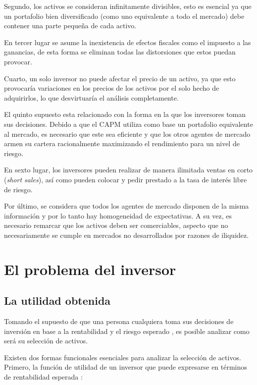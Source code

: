 Segundo, los activos se consideran infinitamente divisibles, esto es esencial ya que un portafolio bien diversificado (como uno equivalente a todo el mercado) debe contener una parte pequeña de cada activo. 

En tercer lugar se asume la inexistencia de efectos fiscales como el impuesto a las ganancias, de esta forma se eliminan todas las distorsiones que estos puedan provocar. 

Cuarto, un solo inversor no puede afectar el precio de un activo, ya que esto provocaría variaciones en los precios de los activos por el solo hecho de adquirirlos, lo que desvirtuaría el análisis completamente. 

El quinto supuesto esta relacionado con la forma en la que los inversores toman sus decisiones. Debido a que el CAPM utiliza como base un portafolio equivalente al mercado, es necesario que este sea eficiente y que los otros agentes de mercado armen su cartera racionalmente maximizando el rendimiento para un nivel de riesgo.

En sexto lugar, los inversores pueden realizar de manera ilimitada ventas en corto (\textit{short sales}), así como pueden colocar y pedir prestado a la tasa de interés libre de riesgo.

Por último, se considera que todos los agentes de mercado disponen de la misma información y por lo tanto hay homogeneidad de expectativas. A su vez, es necesario remarcar que los activos deben ser comerciables, aspecto que no necesariamente se cumple en mercados no desarrollados por razones de iliquidez.


\section{El problema del inversor}

\subsection{La utilidad obtenida}

Tomando el supuesto de que una persona cualquiera toma sus decisiones de inversión en base a la rentabilidad y el riesgo esperado \cite{sharp}, es posible analizar como será su selección de activos.

Existen dos formas funcionales esenciales para analizar la selección de activos. Primero, la función de utilidad de un inversor que puede expresarse en términos de rentabilidad esperada \cite{sharp}:

